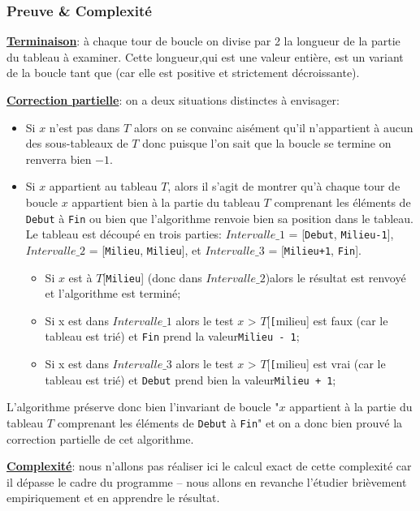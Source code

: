 \documentclass[12pt]{article}
\begin{document}
	\subsubsection*{Preuve \& Complexité}
	\textbf{\uline{Terminaison}}: à chaque tour de boucle on divise par 2 la longueur de la partie du tableau à examiner. Cette longueur,qui est une valeur entière, est un variant de la boucle tant que (car elle est positive et strictement décroissante).
	
	\textbf{\uline{Correction partielle}}: on a deux situations distinctes à envisager:
	\begin{itemize}
		\item Si $x$ n'est pas dans $T$ alors on se convainc aisément qu'il n'appartient à aucun des sous-tableaux de $T$ donc puisque l'on sait que la boucle se termine on renverra bien $-1$.
		\item Si $x$ appartient au tableau $T$, alors il s'agit de montrer qu'à chaque tour de boucle $x$ appartient bien à la partie du tableau $T$ comprenant les éléments de \texttt{Debut} à \texttt{Fin} ou bien que l'algorithme renvoie bien sa position dans le tableau. Le tableau est découpé en trois parties: $Intervalle\_1$ = [\texttt{Debut}, \texttt{Milieu-1}], $Intervalle\_2$ =  [\texttt{Milieu}, \texttt{Milieu}], et $Intervalle\_3$ = [\texttt{Milieu+1}, \texttt{Fin}].
		\begin{itemize}
			\item Si $x$ est à $T$[\texttt{Milieu}] (donc dans $Intervalle\_2$)alors le résultat est renvoyé et l'algorithme est terminé;
			\item Si x est dans $Intervalle\_1$ alors le test $x$ > $T$[\texttt[{milieu}] est faux (car le tableau est trié) et \texttt{Fin} prend la valeur\texttt{Milieu - 1};
			\item Si x est dans $Intervalle\_3$ alors le test $x$ > $T$[\texttt[{milieu}] est vrai (car le tableau est trié) et \texttt{Debut} prend bien la valeur\texttt{Milieu + 1};
		\end{itemize}
	\end{itemize}
	
	L'algorithme préserve donc bien l'invariant de boucle "$x$ appartient à la partie du tableau $T$ comprenant les éléments de \texttt{Debut} à \texttt{Fin}" et on a donc bien prouvé la correction partielle de cet algorithme.
	
	\textbf{\uline{Complexité}}: nous n'allons pas réaliser ici le calcul exact de cette complexité car il dépasse le cadre du programme -- nous allons en revanche l'étudier brièvement empiriquement et en apprendre le résultat.
	
\end{document}
